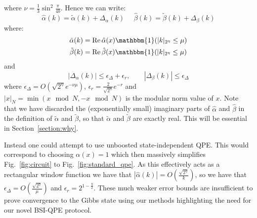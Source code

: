 \documentclass[aps,floatfix,10pt,amssymb,amsfont,amsmath,superscriptaddress,float,nofootinbib,longbibliography,nobalancelastpage,twocolumn]{revtex4-2}
\begin{document}
where $\nu = \frac{1}{3}\sin^2\frac{\pi}{4b}$. Hence we can write:
\begin{equation}
    \hat\alpha(k) = \tilde\alpha(k) + \Delta_{\alpha}(k) \>\>\>\>\>\>\hat\beta(k) = \tilde\beta(k) + \Delta_{\beta}(k)
    \label{eq:decomposealpha}
\end{equation}
where:
\begin{align}
    \tilde\alpha(k) &=\operatorname{Re} \hat\alpha(x)\mathbbm{1}(|k|_{2^{\eta}}\leq \mu)\\
    \tilde\beta(k) &= \operatorname{Re}\hat\beta(x)\mathbbm{1}(|k|_{2^{\eta}}\leq \mu)
    \label{eq:decomposealpha2}
\end{align}  and
\begin{equation}
    |\Delta_\alpha(k)|\leq \epsilon_{\Delta}+\epsilon_r,
    \qquad |\Delta_\beta(k)|\leq \epsilon_{\Delta}
    \label{eq:decomposealpha3}
\end{equation} where $\epsilon_{\Delta} = O(\sqrt{2^{\eta}}e^{-\nu \mu})$, $\epsilon_r = \frac{2}{\sqrt{2^{\eta}}}e^{-r}$ and $|x|_N = \min(x \mod N,- x\mod N)$ is the modular norm value of $x$. Note that we have discarded the (exponentially small) imaginary parts of $\hat\alpha$ and $\hat\beta$ in the definition of $\tilde\alpha$ and $\tilde\beta$, so that $\tilde\alpha$ and $\tilde\beta$ are exactly real. This will be essential in Section~\ref{section:why}.


Instead one could attempt to use unboosted state-independent QPE. This would correspond to choosing $\alpha(x)=1$ which then massively simplifies Fig.~\ref{fig:circuit} to Fig.~\ref{fig:standard_qpe}. As this effectively acts as a rectangular window function we have that $|\hat\alpha(k)| = O(\frac{\sqrt{2^{\eta}}}{k})$, so we have that $\epsilon_{\Delta} = O(\frac{\sqrt{2^{\eta}}}{\mu})$ and $\epsilon_r = 2^{1-\frac{\eta}{2}}$. These much weaker error bounds are insufficient to prove convergence to the Gibbs state using our methods highlighting the need for our novel BSI-QPE protocol.
\end{document}
